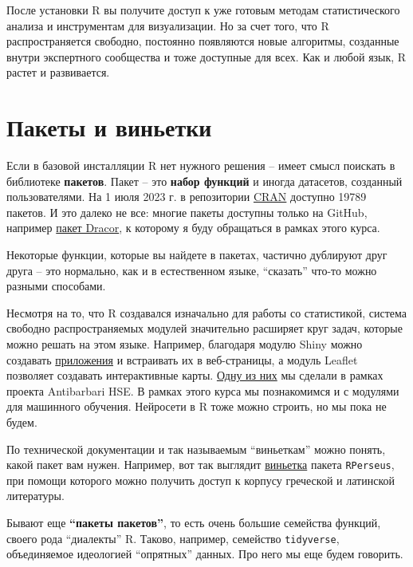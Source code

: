 \documentclass[
]{book}
\theoremstyle{definition}
\theoremstyle{definition}
\theoremstyle{definition}
\theoremstyle{definition}
\theoremstyle{remark}
\begin{document}
После установки R вы получите доступ к уже готовым методам статистического анализа и инструментам для визуализации. Но за счет того, что R распространяется свободно, постоянно появляются новые алгоритмы, созданные внутри экспертного сообщества и тоже доступные для всех. Как и любой язык, R растет и развивается.

\hypertarget{ux43fux430ux43aux435ux442ux44b-ux438-ux432ux438ux43dux44cux435ux442ux43aux438}{%
\section{Пакеты и виньетки}\label{ux43fux430ux43aux435ux442ux44b-ux438-ux432ux438ux43dux44cux435ux442ux43aux438}}

Если в базовой инсталляции R нет нужного решения -- имеет смысл поискать в библиотеке \textbf{пакетов}. Пакет -- это \textbf{набор функций} и иногда датасетов, созданный пользователями. На 1 июля 2023 г. в репозитории \href{https://cran.r-project.org/}{CRAN} доступно 19789 пакетов. И это далеко не все: многие пакеты доступны только на GitHub, например \href{https://rdrr.io/github/dracor-org/rdracor/f/README.md}{пакет Dracor}, к которому я буду обращаться в рамках этого курса.

Некоторые функции, которые вы найдете в пакетах, частично дублируют друг друга -- это нормально, как и в естественном языке, ``сказать'' что-то можно разными способами.

Несмотря на то, что R создавался изначально для работы со статистикой, система свободно распространяемых модулей значительно расширяет круг задач, которые можно решать на этом языке. Например, благодаря модулю Shiny можно создавать \href{https://locusclassicus.shinyapps.io/myshinyapp/}{приложения} и встраивать их в веб-страницы, а модуль Leaflet позволяет создавать интерактивные карты. \href{http://antibarbari.ru/2023/03/01/cicero_villas/}{Одну из них} мы сделали в рамках проекта Antibarbari HSE. В рамках этого курса мы познакомимся и с модулями для машинного обучения. Нейросети в R тоже можно строить, но мы пока не будем.

По технической документации и так называемым ``виньеткам'' можно понять, какой пакет вам нужен. Например, вот так выглядит \href{https://docs.ropensci.org/rperseus/articles/rperseus-vignette.html}{виньетка} пакета \texttt{RPerseus}, при помощи которого можно получить доступ к корпусу греческой и латинской литературы.

Бывают еще \textbf{``пакеты пакетов''}, то есть очень большие семейства функций, своего рода ``диалекты'' R. Таково, например, семейство \texttt{tidyverse}, объединяемое идеологией ``опрятных'' данных. Про него мы еще будем говорить.
\end{document}
